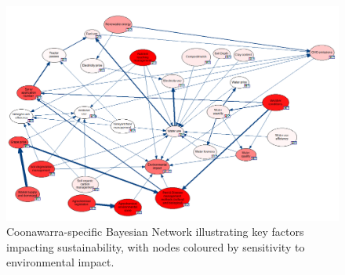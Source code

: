 

\begin{figure}[h!]
    \centering
    \includegraphics[width=\linewidth]{robyn}
    \caption{Coonawarra-specific Bayesian Network illustrating key factors impacting sustainability, with nodes coloured by sensitivity to environmental impact.}\label{fig:robyn}
\end{figure}

